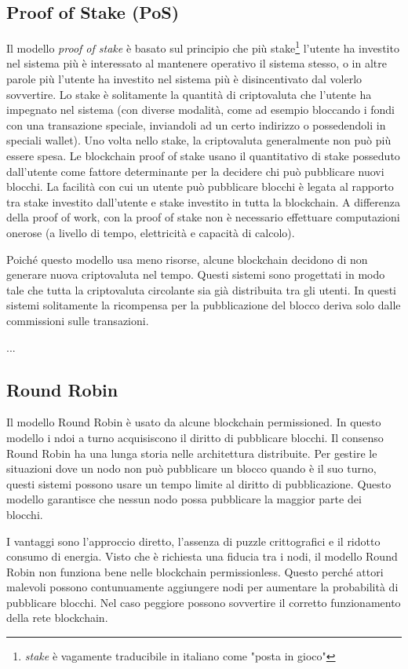 \subsection{Proof of Stake (PoS)}
Il modello \textit{proof of stake} è basato sul principio che più stake\footnote{
	\textit{stake} è vagamente traducibile in italiano	come "posta in gioco"}
l'utente ha investito nel sistema
più è interessato al mantenere operativo il sistema stesso, o in altre parole più l'utente ha investito
nel sistema più è disincentivato dal volerlo sovvertire.
Lo stake è solitamente la quantità di criptovaluta che l'utente ha impegnato nel sistema (con
diverse modalità, come ad esempio bloccando i fondi con una transazione speciale, inviandoli ad un certo
indirizzo o possedendoli in speciali wallet). Uno volta nello stake, la criptovaluta generalmente non
può più essere spesa. Le blockchain proof of stake usano il quantitativo di stake posseduto dall'utente
come fattore determinante per la decidere chi può pubblicare nuovi blocchi. La facilità con cui un utente
può pubblicare blocchi è legata al rapporto tra stake investito dall'utente e stake
investito in tutta la blockchain. A differenza della proof of work, con la proof of stake
non è necessario effettuare computazioni onerose (a livello di tempo, elettricità e capacità di calcolo).

Poiché questo modello usa meno risorse, alcune blockchain decidono di non generare nuova criptovaluta
nel tempo. Questi sistemi sono progettati in modo tale che tutta la criptovaluta circolante
sia già distribuita tra gli utenti.
In questi sistemi solitamente la ricompensa per la pubblicazione del blocco deriva
solo dalle commissioni sulle transazioni.

...


\subsection{Round Robin}
Il modello Round Robin è usato da alcune blockchain permissioned.
In questo modello i ndoi a turno acquisiscono il diritto di pubblicare blocchi. Il consenso
Round Robin ha una lunga storia nelle architettura distribuite. Per gestire le situazioni
dove un nodo non può pubblicare un blocco quando è il suo turno, questi sistemi possono
usare un tempo limite al diritto di pubblicazione. Questo modello garantisce che nessun nodo possa
pubblicare la maggior parte dei blocchi.

I vantaggi sono l'approccio diretto, l'assenza di puzzle crittografici e il ridotto consumo di energia.
Visto che è richiesta una fiducia tra i nodi, il modello Round Robin non funziona bene
nelle blockchain permissionless. Questo perché attori malevoli possono contunuamente aggiungere
nodi per aumentare la probabilità di pubblicare blocchi. Nel caso peggiore possono
sovvertire il corretto funzionamento della rete blockchain.

